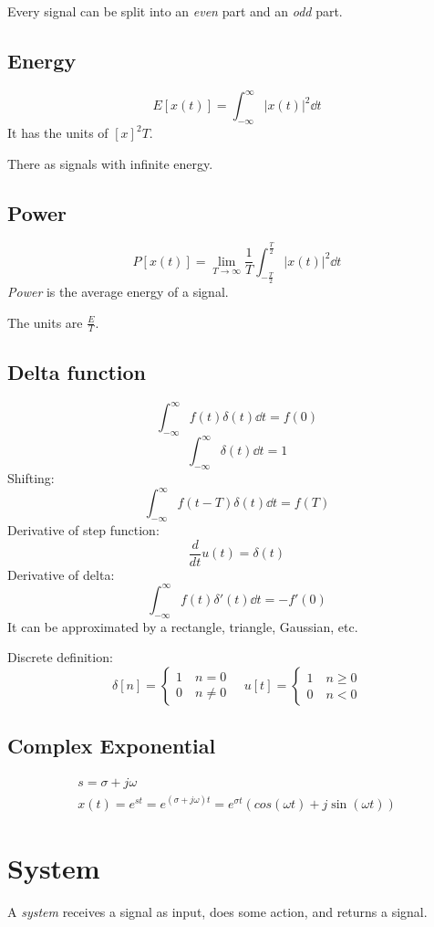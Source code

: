 \documentclass[00_complete]{subfiles}
\begin{document}
Every signal can be split into an \textit{even} part and an \textit{odd} part.

\subsection{Energy}
$$ E[x(t)]  = \int_{-\infty}^{\infty}|x(t)|^2\dd{t}$$
It has the units of $[x]^2T$.
\begin{note}
    There as signals with infinite energy.
\end{note}
\subsection{Power}
$$P[x(t)]=\lim_{T \to \infty}\frac{1}{T}\int_{-\frac{T}{2}}^{\frac{T}{2}}|x(t)|^2\dd{t}$$
\textit{Power} is the average energy of a signal.

The units are $\frac{E}{T}$.
\subsection{Delta function}
$$\int_{-\infty}^{\infty}f(t)\delta(t)\dd{t}=f(0)$$
$$\int_{-\infty}^{\infty}\delta(t)\dd{t}=1$$
Shifting:
$$\int_{-\infty}^{\infty}f(t-T)\delta(t)\dd{t}=f(T)$$
Derivative of step function:
$$\frac{d}{dt}u(t)=\delta(t)$$
Derivative of delta:
$$\int_{-\infty}^{\infty}f(t)\delta'(t)\dd{t}=-f'(0)$$
It can be approximated by a rectangle, triangle, Gaussian, etc.

Discrete definition:
$$\delta[n] = \begin{cases}
        1 \quad n=0 \\ 0 \quad n \neq 0
    \end{cases} \quad 
            u[t] = \begin{cases}
        1 \quad n \ge 0 \\ 0 \quad n < 0
    \end{cases}$$

\subsection{Complex Exponential}
\begin{gather*}
    s = \sigma + j\omega \\
    x(t) = e^{st}=e^{(\sigma + j\omega)t}=e^{\sigma t}(cos(\omega t) +
    j\sin(\omega t))
\end{gather*}
\section{System}
A \textit{system} receives a signal as input, does some action, and returns a
signal.
\end{document}
